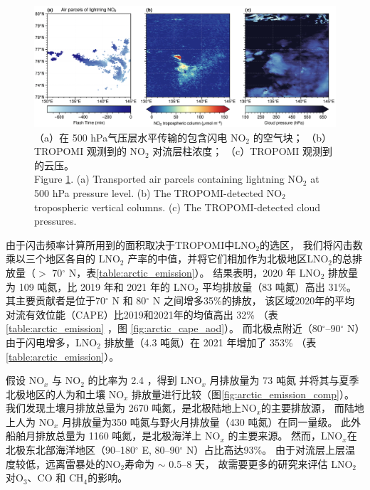 \begin{figure}[!htbp]
\centering
\includegraphics[width=15cm]{./figures/arctic_large_lno2.png}
\caption{
（a）在 500 hPa气压层水平传输的包含闪电 NO$_2$ 的空气块；
（b）TROPOMI 观测到的 NO$_2$ 对流层柱浓度；
（c）TROPOMI 观测到的云压。\\
Figure \ref{fig:arctic_large_lno2}. (a) Transported air parcels containing lightning NO$_2$ at 500 hPa pressure level.
(b) The TROPOMI-detected NO$_2$ tropospheric vertical columns.
(c) The TROPOMI-detected cloud pressures.
}
\label{fig:arctic_large_lno2}
\end{figure}


由于闪击频率计算所用到的面积取决于TROPOMI中LNO$_2$的选区，
我们将闪击数乘以三个地区各自的 LNO$_2$ 产率的中值，并将它们相加作为北极地区LNO$_2$的总排放量（$>$ 70$^{\circ}$ N，表\ref{table:arctic_emission}）。
结果表明，2020 年 LNO$_2$ 排放量为 109 吨氮，比 2019 年和 2021 年的 LNO$_2$ 平均排放量（83 吨氮）高出 31\%。
其主要贡献者是位于70$^{\circ}$ N 和 80$^{\circ}$ N 之间增多35\%的排放，
该区域2020年的平均对流有效位能（CAPE）比2019和2021年的均值高出 32\%
（表\ref{table:arctic_emission} ，图 \ref{fig:arctic_cape_aod}）。
而北极点附近（80$^{\circ}$--90$^{\circ}$ N）由于闪电增多，LNO$_2$ 排放量（4.3 吨氮）在 2021 年增加了 353\% （表 \ref{table:arctic_emission}）。

假设 NO$_x$ 与 NO$_2$ 的比率为 2.4 \citep{Silvern.2018}，得到 LNO$_x$ 月排放量为 73 吨氮
并将其与夏季北极地区的人为和土壤 NO$_x$ 排放量进行比较（图\ref{fig:arctic_emission_comp}）。
我们发现土壤月排放总量为 2670 吨氮，是北极陆地上NO$_x$的主要排放源，
而陆地上人为 NO$_x$ 月排放量为350 吨氮与野火月排放量（430 吨氮）在同一量级。
此外船舶月排放总量为 1160 吨氮，是北极海洋上 NO$_x$ 的主要来源。
然而，LNO$_x$在北极东北部海洋地区（90--180$^{\circ}$ E, 80--90$^{\circ}$ N）占比高达93\%。
由于对流层上层温度较低，远离雷暴处的NO$_2$寿命为 $\sim$ 0.5--8 天\citep{Schumann.2007,Nault.2017}，
故需要更多的研究来评估 LNO$_2$对O$_3$、CO 和 CH$_4$的影响。


